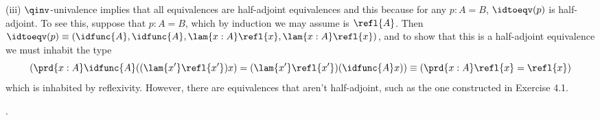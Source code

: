 (iii) $\qinv$-univalence implies that all equivalences are half-adjoint
equivalences and this because for any $p : A = B$, $\idtoeqv(p)$ is
half-adjoint.  To see this, suppose that $p : A = B$, which by induction we may
assume is $\refl{A}$.  Then $\idtoeqv(p) \equiv (\idfunc{A}, \idfunc{A},
\lam{x:A}\refl{x}, \lam{x:A}\refl{x})$, and to show that this is a half-adjoint
equivalence we must inhabit the type
\[
\left(
  \prd{x : A}\idfunc{A}((\lam{x'}\refl{x'})x) 
             = (\lam{x'}\refl{x'})(\idfunc{A}x)
             \right)
  \equiv
  \left(
  \prd{x : A}\refl{x} = \refl{x}
  \right)
\]
which is inhabited by reflexivity.  However, there are equivalences that aren't
half-adjoint, such as the one constructed in Exercise 4.1.
\begin{coqdoccode}
\coqdocemptyline
\coqdocnoindent
{} .\coqdoceol
\end{coqdoccode}
